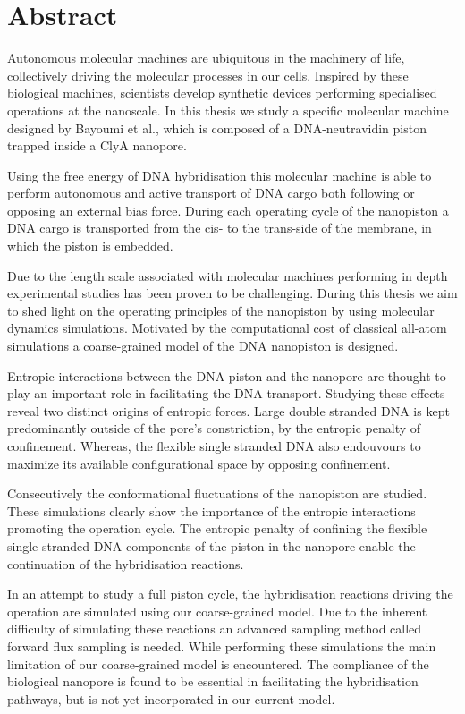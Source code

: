 \chapter*{Abstract}

Autonomous molecular machines are ubiquitous in the machinery of life, collectively
driving the molecular processes in our cells. Inspired by these biological machines,
scientists
develop synthetic devices performing specialised operations at the nanoscale. In this
thesis we study a specific molecular machine designed by Bayoumi et al.\cite{Bayoumi21},
which is composed of a DNA-neutravidin piston trapped inside a ClyA nanopore.

Using the free energy of DNA hybridisation this molecular machine is able to perform
autonomous and active transport of DNA cargo both following or opposing an
external bias force. During each operating cycle of the nanopiston a DNA cargo
is transported from the cis- to the trans-side of the membrane, in which the piston is
embedded.

Due to the length scale associated with molecular machines performing in depth
experimental studies has been proven to be challenging. During this thesis we aim
to shed light on the operating principles of the nanopiston by using molecular dynamics
simulations. Motivated by the computational cost of classical all-atom simulations a
coarse-grained model of the DNA nanopiston is designed.

Entropic interactions between the DNA piston and the nanopore are thought to
play an important role in facilitating the DNA transport. Studying these effects reveal
two distinct origins of entropic forces. Large double stranded DNA is kept predominantly
outside of the pore's constriction, by the entropic penalty of confinement.  Whereas, the
flexible single stranded DNA also
endouvours to maximize its available configurational space by opposing confinement.

Consecutively the  conformational fluctuations of
the nanopiston are studied.  These simulations clearly show the importance of the
entropic interactions promoting the operation cycle.  The entropic
penalty of confining the flexible single stranded DNA components of the piston in the
nanopore enable the continuation of the hybridisation reactions.

In an attempt to study a full piston cycle, the hybridisation reactions driving the
operation are simulated using our coarse-grained
model. Due to the inherent difficulty of simulating these reactions an advanced
sampling method called forward flux sampling is needed.
While performing these simulations the main limitation of our coarse-grained model is
encountered. The compliance of the biological nanopore is found to be essential in
facilitating the hybridisation pathways, but is not yet incorporated in our current
model.

\cleardoublepage
